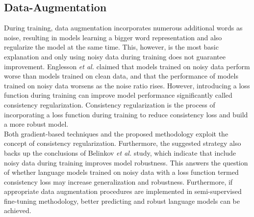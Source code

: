 \documentclass[%
	BCOR=8mm, %
	DIV=12,
	toc=bibliography, %
	toc=listof, %
	oneside, %
	egregdoesnotlikesansseriftitles, %
	]{scrbook}
\begin{document}
\subsection{Data-Augmentation}
During training, data augmentation incorporates numerous additional words as noise, resulting in models learning a bigger word representation and also regularize the model at the same time. This, however, is the most basic explanation and only using noisy data during training does not guarantee improvement. Englesson \textit{et al.} \cite{englesson_consistency_2021} claimed that models trained on noisy data perform worse than models trained on clean data, and that the performance of models trained on noisy data worsens as the noise ratio rises. However, introducing a loss function during training can improve model performance significantly called consistency regularization. Consistency regularization is the process of incorporating a loss function during training to reduce consistency loss and build a more robust model.\\
Both gradient-based techniques \cite{miyato_virtual_2018} and the proposed methodology exploit the concept of consistency regularization. Furthermore, the suggested strategy also backs up the conclusions of Belinkov \textit{et al.} \cite{belinkov_synthetic_2018} study, which indicate that include noisy data during training improves model robustness. This answers the question of whether language models trained on noisy data with a loss function termed consistency loss may increase generalization and robustness. Furthermore, if appropriate data augmentation procedures are implemented in semi-supervised fine-tuning methodology, better predicting and robust language models can be achieved.
\end{document}
